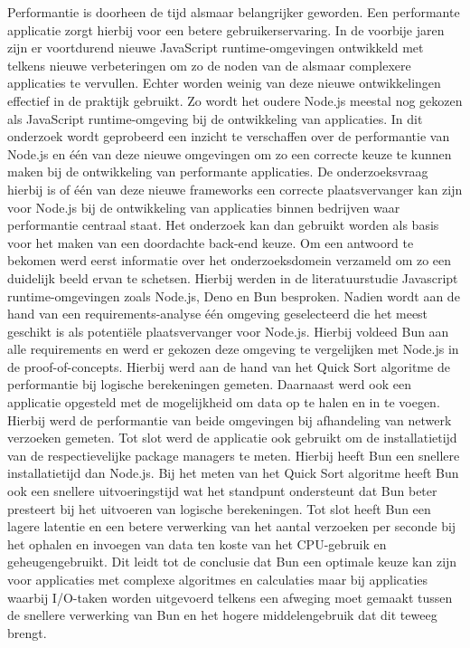 Performantie is doorheen de tijd alsmaar belangrijker geworden. 
Een performante applicatie zorgt hierbij voor een betere gebruikerservaring.
In de voorbije jaren zijn er voortdurend nieuwe JavaScript runtime-omgevingen ontwikkeld met telkens nieuwe verbeteringen om
 zo de noden van de alsmaar complexere applicaties te vervullen. 
Echter worden weinig van deze nieuwe ontwikkelingen effectief in de praktijk gebruikt.
Zo wordt het oudere Node.js meestal nog gekozen als JavaScript runtime-omgeving bij de ontwikkeling van applicaties.
In dit onderzoek wordt geprobeerd een inzicht te verschaffen over de performantie van Node.js en één van deze nieuwe omgevingen
om zo een correcte keuze te kunnen maken bij de ontwikkeling van performante applicaties.
De onderzoeksvraag hierbij is of één van deze nieuwe frameworks  
een correcte plaatsvervanger kan zijn voor Node.js bij de ontwikkeling van applicaties binnen bedrijven 
waar performantie centraal staat. Het onderzoek kan dan gebruikt worden als basis 
voor het maken van een doordachte back-end keuze.
Om een antwoord te bekomen werd eerst informatie over het onderzoeksdomein verzameld om zo een duidelijk beeld ervan te schetsen.
Hierbij werden in de literatuurstudie Javascript runtime-omgevingen zoals Node.js, Deno en Bun besproken.
Nadien wordt aan de hand van een requirements-analyse één omgeving geselecteerd die het meest geschikt is als potentiële plaatsvervanger voor Node.js.
Hierbij voldeed Bun aan alle requirements en werd er gekozen deze omgeving te vergelijken met Node.js in de proof-of-concepts.
Hierbij werd aan de hand van het Quick Sort algoritme de performantie bij logische berekeningen gemeten.
Daarnaast werd ook een applicatie opgesteld met de mogelijkheid om data op te halen en in te voegen. 
Hierbij werd de performantie van beide omgevingen bij afhandeling van netwerk verzoeken gemeten.
Tot slot werd de applicatie ook gebruikt om de installatietijd van de respectievelijke package managers te meten.
Hierbij heeft Bun een snellere installatietijd dan Node.js.
Bij het meten van het Quick Sort algoritme heeft Bun ook een snellere uitvoeringstijd wat het standpunt ondersteunt dat Bun beter presteert bij het uitvoeren van logische berekeningen.
Tot slot heeft Bun een lagere latentie en een betere verwerking van het aantal verzoeken per seconde bij het ophalen en invoegen van data ten koste van het CPU-gebruik en geheugengebruikt.
Dit leidt tot de conclusie dat  Bun een optimale keuze kan zijn voor applicaties met complexe algoritmes en calculaties maar 
bij applicaties waarbij I/O-taken worden uitgevoerd telkens een afweging moet gemaakt tussen de snellere verwerking van Bun en het hogere middelengebruik dat dit teweeg brengt.


